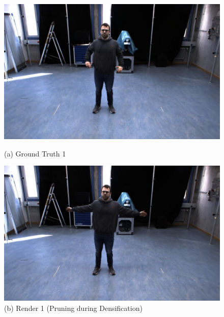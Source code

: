 \begin{figure}[htbp]
    \centering

    \begin{minipage}[b]{0.48\textwidth}
        \centering
        \includegraphics[width=\linewidth]{bilder/Results/Wang/Prune/C-1-M_000000.jpg}
        \caption*{(a) Ground Truth 1}
    \end{minipage}\hfill
    \begin{minipage}[b]{0.48\textwidth}
        \centering
        \includegraphics[width=\linewidth]{bilder/Results/Wang/Prune/C-1-M_000015.jpg}
        \caption*{(b) Render 1 (Pruning during Densification)}
    \end{minipage}

    \vspace{0.5cm}


\end{figure}
